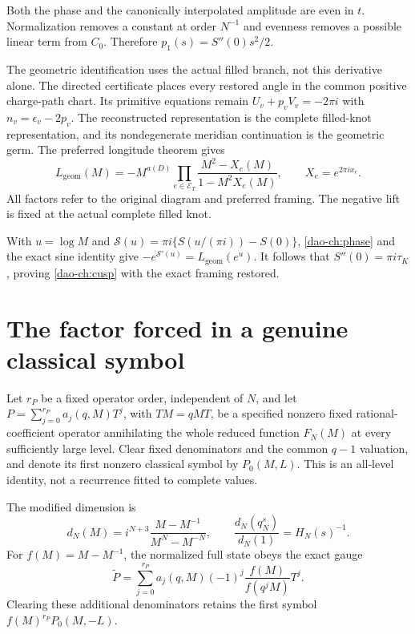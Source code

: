Both the phase and the canonically interpolated amplitude are even
in $t$. Normalization removes a constant at order $N^{-1}$ and
evenness removes a possible linear term from $C_0$. Therefore
$p_1(s)=S''(0)s^2/2$.

The geometric identification uses the actual filled branch, not
this derivative alone. The directed certificate places every
restored angle in the common positive charge-path chart. Its
primitive equations remain $U_v+p_vV_v=-2\pi i$ with
$n_v=\epsilon_v-2p_v$. The reconstructed representation is the
complete filled-knot representation, and its nondegenerate
meridian continuation is the geometric germ. The preferred
longitude theorem gives
\begin{equation}\label{dao-ch:longitude}
 L_{\mathrm{geom}}(M)
 =-M^{a(D)}\prod_{e\in\mathcal E_T}
            \frac{M^2-X_e(M)}{1-M^2X_e(M)},
       \qquad X_e=e^{2\pi ix_e}.
\end{equation}
All factors refer to the original diagram and preferred framing.
The negative lift is fixed at the actual complete filled knot.

With $u=\log M$ and
$\mathcal S(u)=\pi i\{S(u/(\pi i))-S(0)\}$,
\eqref{dao-ch:phase} and the exact sine identity give
$-e^{\mathcal S'(u)}=L_{\mathrm{geom}}(e^u)$.
It follows that $S''(0)=\pi i\tau_K$, proving
\eqref{dao-ch:cusp} with the exact framing restored.

\section{The factor forced in a genuine classical symbol}
\label{dao-ch:operator}

Let $r_P$ be a fixed operator order, independent of $N$, and let $P=\sum_{j=0}^{r_P}a_j(q,M)T^j$, with $TM=qMT$, be a specified
nonzero fixed rational-coefficient operator annihilating the whole
reduced function $F_N(M)$ at every sufficiently large level.
Clear fixed denominators and the common $q-1$ valuation, and denote
its first nonzero classical symbol by $P_0(M,L)$. This is an
all-level identity, not a recurrence fitted to complete values.

The modified dimension is
\[
 d_N(M)=i^{N+3}\frac{M-M^{-1}}{M^N-M^{-N}},
       \qquad \frac{d_N(q_N^s)}{d_N(1)}=H_N(s)^{-1}.
\]
For $f(M)=M-M^{-1}$, the normalized full state obeys the exact gauge
\begin{equation}\label{dao-ch:gauge}
 \widetilde P=\sum_{j=0}^{r_P}a_j(q,M)(-1)^j
                 \frac{f(M)}{f(q^jM)}T^j.
\end{equation}
Clearing these additional denominators retains the first symbol
$f(M)^{r_P}P_0(M,-L)$.


